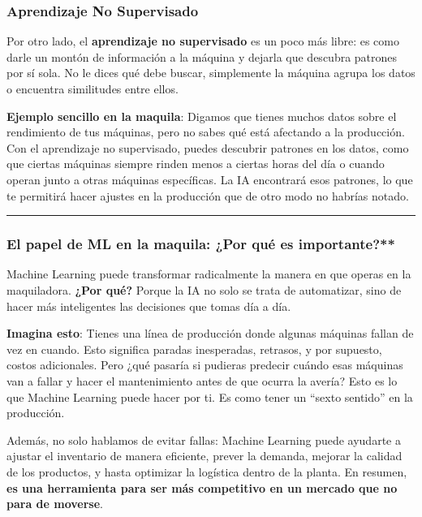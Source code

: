 \documentclass[
  10pt,
  letterpaper,
]{book}
\begin{document}
\subsubsection{\texorpdfstring{\textbf{Aprendizaje No
Supervisado}}{Aprendizaje No Supervisado}}\label{aprendizaje-no-supervisado}

Por otro lado, el \textbf{aprendizaje no supervisado} es un poco más
libre: es como darle un montón de información a la máquina y dejarla que
descubra patrones por sí sola. No le dices qué debe buscar, simplemente
la máquina agrupa los datos o encuentra similitudes entre ellos.

\textbf{Ejemplo sencillo en la maquila}: Digamos que tienes muchos datos
sobre el rendimiento de tus máquinas, pero no sabes qué está afectando a
la producción. Con el aprendizaje no supervisado, puedes descubrir
patrones en los datos, como que ciertas máquinas siempre rinden menos a
ciertas horas del día o cuando operan junto a otras máquinas
específicas. La IA encontrará esos patrones, lo que te permitirá hacer
ajustes en la producción que de otro modo no habrías notado.

\begin{center}\rule{0.5\linewidth}{0.5pt}\end{center}

\subsubsection{El papel de ML en la maquila: ¿Por qué es
importante?**}\label{el-papel-de-ml-en-la-maquila-por-quuxe9-es-importante}

Machine Learning puede transformar radicalmente la manera en que operas
en la maquiladora. \textbf{¿Por qué?} Porque la IA no solo se trata de
automatizar, sino de hacer más inteligentes las decisiones que tomas día
a día.

\textbf{Imagina esto}: Tienes una línea de producción donde algunas
máquinas fallan de vez en cuando. Esto significa paradas inesperadas,
retrasos, y por supuesto, costos adicionales. Pero ¿qué pasaría si
pudieras predecir cuándo esas máquinas van a fallar y hacer el
mantenimiento antes de que ocurra la avería? Esto es lo que Machine
Learning puede hacer por ti. Es como tener un ``sexto sentido'' en la
producción.

Además, no solo hablamos de evitar fallas: Machine Learning puede
ayudarte a ajustar el inventario de manera eficiente, prever la demanda,
mejorar la calidad de los productos, y hasta optimizar la logística
dentro de la planta. En resumen, \textbf{es una herramienta para ser más
competitivo en un mercado que no para de moverse}.
\end{document}

